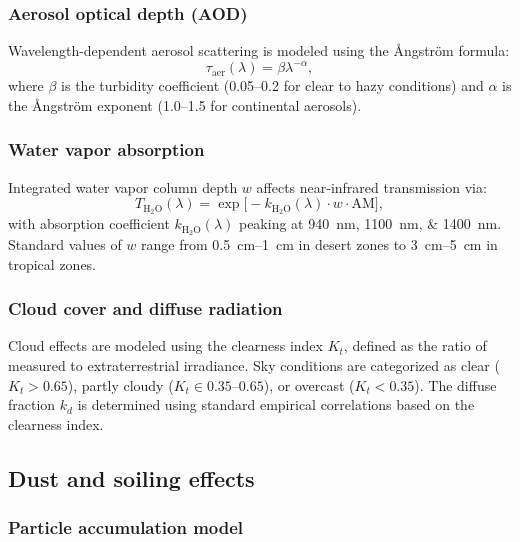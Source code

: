 \documentclass[11pt,a4paper]{article}
\begin{document}
\subsubsection{Aerosol optical depth (AOD)}

Wavelength-dependent aerosol scattering is modeled using the \AA ngstr\"om formula:
\begin{equation}
\tau_{\mathrm{aer}}(\lambda) = \beta \lambda^{-\alpha},
\end{equation}
where $\beta$ is the turbidity coefficient (\numrange{0.05}{0.2} for clear to hazy conditions) and $\alpha$ is the \AA ngstr\"om exponent (\numrange{1.0}{1.5} for continental aerosols).

\subsubsection{Water vapor absorption}

Integrated water vapor column depth $w$ affects near-infrared transmission via:
\begin{equation}
T_{\mathrm{H_2O}}(\lambda) = \exp\!\bigl[-k_{\mathrm{H_2O}}(\lambda) \cdot w \cdot \mathrm{AM}\bigr],
\end{equation}
with absorption coefficient $k_{\mathrm{H_2O}}(\lambda)$ peaking at \SIlist{940;1100;1400}{\nano\meter}. Standard values of $w$ range from \SIrange{0.5}{1}{\centi\meter} in desert zones to \SIrange{3}{5}{\centi\meter} in tropical zones.

\subsubsection{Cloud cover and diffuse radiation}

Cloud effects are modeled using the clearness index $K_t$, defined as the ratio of measured to extraterrestrial irradiance. Sky conditions are categorized as clear ($K_t > 0.65$), partly cloudy ($K_t \in \numrange{0.35}{0.65}$), or overcast ($K_t < 0.35$). The diffuse fraction $k_d$ is determined using standard empirical correlations based on the clearness index.

\subsection{Dust and soiling effects}

\subsubsection{Particle accumulation model}
\end{document}
